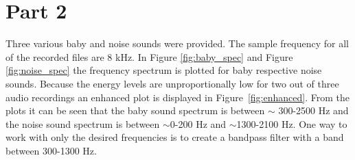 \newpage
\section{Part 2}
Three various baby and noise sounds were provided. The sample frequency for all of the recorded 
files are 8 kHz. In Figure \ref{fig:baby_spec} and Figure \ref{fig:noise_spec} the frequency 
spectrum is plotted for baby respective noise sounds. Because the energy levels are unproportionally 
low for two out of three audio recordings an enhanced plot is displayed in Figure~\ref{fig:enhanced}. 
From the plots it can be seen that the baby sound spectrum is between $\sim$ 300-2500 Hz and the 
noise sound spectrum is between $\sim$0-200 Hz and $\sim$1300-2100 Hz. One way to work with only
the desired frequencies is to create a bandpass filter with a band between 300-1300 Hz. 

%

